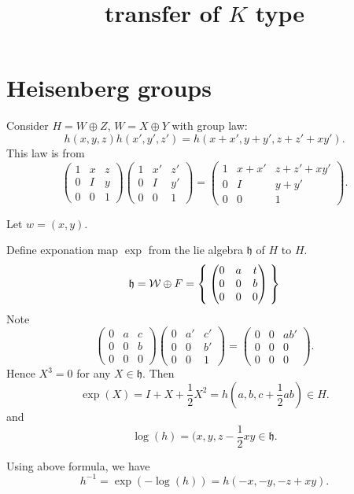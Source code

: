 \documentclass[12pt]{article}
\title{transfer of $K$ type}
\def\lww{\mathcal{W}}
\def\fhh{\mathfrak{h}}
\begin{document}
\maketitle

\section{Heisenberg groups}
Consider $H = W\oplus Z$, $W = X\oplus Y$ 
with group law: 
\[
h(x,y,z)h(x',y',z') = h(x+x', y+y', z+z'+xy').
\]
This law is from 
\[
\begin{pmatrix}
1 & x & z\\
0 & I & y\\
0 & 0 & 1
\end{pmatrix}
\begin{pmatrix}
1 & x' & z'\\
0 & I & y'\\
0 & 0 & 1
\end{pmatrix}
=
\begin{pmatrix}
1 & x+x' & z+z'+ x y'\\
0 & I & y+y'\\
0 & 0 & 1
\end{pmatrix}.
\]

Let $w = (x,y)$. 

Define exponation map $\exp$ from the lie algebra $\fhh$ of $H$ to $H$. 
\[
\fhh = \lww\oplus F= \Set{\begin{pmatrix}
    0 & a & t\\
    0 & 0 & b\\
    0 & 0 & 0
  \end{pmatrix}}
\]
Note
\[
\begin{pmatrix}
0 & a & c\\
0 & 0 & b\\
0 & 0 & 0
\end{pmatrix}
\begin{pmatrix}
0 & a' & c'\\
0 & 0 & b'\\
0 & 0 & 1
\end{pmatrix}
=
\begin{pmatrix}
0 & 0 & a b'\\
0 & 0 & 0\\
0 & 0 & 0
\end{pmatrix}.
\]
Hence $X^3 = 0$ for any $X\in \fhh$. 
Then 
\[
\exp(X) = I + X + \frac{1}{2}X^2= h(a,b, c+ \frac{1}{2} ab) \in H. \]
and
\[ 
\log(h) = (x,y, z-\frac{1}{2}xy\in \fhh. 
\]

Using above formula, we have
\[
h^{-1} = \exp(-\log(h)) = h(-x,-y,-z+x y).
\]
\end{document}
